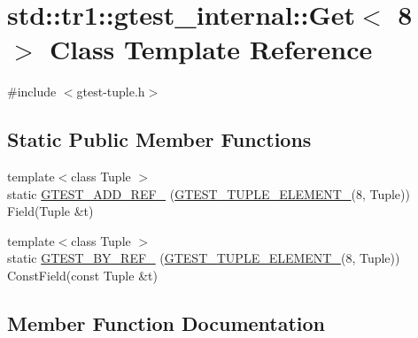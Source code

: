 \hypertarget{classstd_1_1tr1_1_1gtest__internal_1_1Get_3_018_01_4}{}\section{std\+:\+:tr1\+:\+:gtest\+\_\+internal\+:\+:Get$<$ 8 $>$ Class Template Reference}
\label{classstd_1_1tr1_1_1gtest__internal_1_1Get_3_018_01_4}


{\ttfamily \#include $<$gtest-\/tuple.\+h$>$}

\subsection*{Static Public Member Functions}
\begin{DoxyCompactItemize}
\item 
{\footnotesize template$<$class Tuple $>$ }\\static \hyperlink{classstd_1_1tr1_1_1gtest__internal_1_1Get_3_018_01_4_adf667300b7efed278f4ee3bf4d2edb85}{G\+T\+E\+S\+T\+\_\+\+A\+D\+D\+\_\+\+R\+E\+F\+\_\+} (\hyperlink{gtest-tuple_8h_a1b7f133d8aa02e0b7afed7b66781eeb7}{G\+T\+E\+S\+T\+\_\+\+T\+U\+P\+L\+E\+\_\+\+E\+L\+E\+M\+E\+N\+T\+\_\+}(8, Tuple)) Field(Tuple \&t)
\item 
{\footnotesize template$<$class Tuple $>$ }\\static \hyperlink{classstd_1_1tr1_1_1gtest__internal_1_1Get_3_018_01_4_ab9645513ad2f983157f4062c89e910e7}{G\+T\+E\+S\+T\+\_\+\+B\+Y\+\_\+\+R\+E\+F\+\_\+} (\hyperlink{gtest-tuple_8h_a1b7f133d8aa02e0b7afed7b66781eeb7}{G\+T\+E\+S\+T\+\_\+\+T\+U\+P\+L\+E\+\_\+\+E\+L\+E\+M\+E\+N\+T\+\_\+}(8, Tuple)) Const\+Field(const Tuple \&t)
\end{DoxyCompactItemize}


\subsection{Member Function Documentation}
